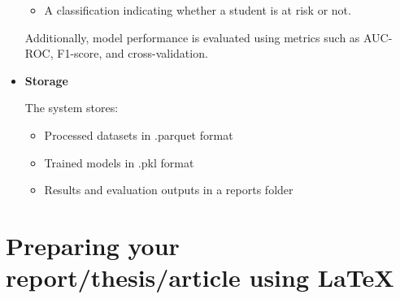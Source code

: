 \begin{spacing}{1.5}
\begin{itemize}
\begin{itemize}
\item A classification indicating whether a student is at risk or not.
\end{itemize}

Additionally, model performance is evaluated using metrics such as AUC-ROC, F1-score, and cross-validation.

\item \textbf{Storage}

The system stores:
\begin{itemize}
    \item Processed datasets in .parquet format

\item Trained models in .pkl format

\item Results and evaluation outputs in a reports folder
\end{itemize}





\end{itemize}
\section{Preparing your report/thesis/article using \LaTeX}
\paragraph{}

\end{spacing}
